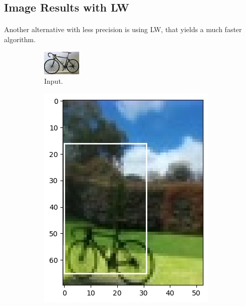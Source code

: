 \documentclass{beamer}
\theoremstyle{definition}
\theoremstyle{remark}
\theoremstyle{example}
\newif\ifinsection
\newif\ifinsubsection
\let\oldsubsection\subsection
\renewcommand{\subsection}{
  \global\insubsectiontrue
  \oldsubsection}
\newcommand {\aframe}[1] {
  \begin{frame}
    \ifinsection\frametitle{\secname}\fi
    \ifinsubsection\framesubtitle{\subsecname}\fi
  #1
  \end{frame}
}
\begin{document}
\subsection{Image Results with LW}
\aframe{Another alternative with less precision is using LW, that yields a much
  faster algorithm. \pause
  \begin{figure}
    \centering
    \begin{subfigure}[b]{0.32\textwidth}
      \centering \includegraphics[width=\textwidth]{figs/input4.jpg}
      \caption{Input.}
    \end{subfigure}
    \begin{subfigure}[b]{0.32\textwidth}
      \centering \includegraphics[width=\textwidth]{figs/0-4-0-test_case1.jpg}

\end{subfigure}
\end{figure}}
\end{document}
